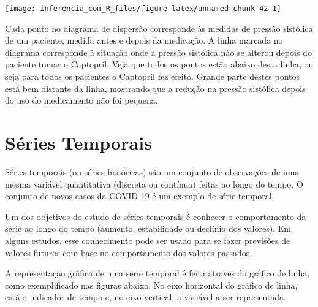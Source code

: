 \documentclass[
]{book}
\begin{document}
\begin{center}\texttt{[image: inferencia\_com\_R\_files/figure-latex/unnamed-chunk-42-1]} \end{center}

Cada ponto no diagrama de dispersão corresponde às medidas de pressão sistólica de um paciente, medida antes e depois da medicação. A linha marcada no diagrama corresponde à situação onde a pressão sistólica não se alterou depois do paciente tomar o Captopril. Veja que todos os pontos estão abaixo desta linha, ou seja para todos os pacientes o Captopril fez efeito. Grande parte destes pontos está bem distante da linha, mostrando que a redução na pressão sistólica depois do uso do medicamento não foi pequena.

\hypertarget{suxe9ries-temporais}{%
\section{Séries Temporais}\label{suxe9ries-temporais}}

Séries temporais (ou séries históricas) são um conjunto de observações de uma mesma variável quantitativa (discreta ou contínua) feitas ao longo do tempo. O conjunto de novos casos da COVID-19 é um exemplo de série temporal.

Um dos objetivos do estudo de séries temporais é conhecer o comportamento da série ao longo do tempo (aumento, estabilidade ou declínio dos valores). Em alguns estudos, esse conhecimento pode ser usado para se fazer previsões de valores futuros com base no comportamento dos valores passados.

A representação gráfica de uma série temporal é feita através do gráfico de linha, como exemplificado nas figuras abaixo. No eixo horizontal do gráfico de linha, está o indicador de tempo e, no eixo vertical, a variável a ser representada.
\end{document}
